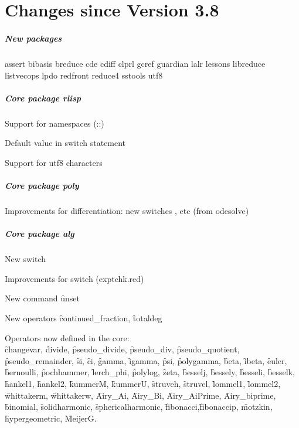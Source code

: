\chapter{Changes since Version 3.8}

\paragraph*{New packages}

assert
bibasis
breduce
cde
cdiff
clprl
gcref
guardian
lalr
lessons
libreduce
listvecops
lpdo
redfront
reduce4
sstools
utf8

\paragraph*{Core package rlisp}

Support for namespaces (::)

Default value in switch statement

Support for utf8 characters

\paragraph*{Core package poly}

Improvements for differentiation: new switches ,  etc
(from odesolve)

\paragraph*{Core package alg}

New switch 

Improvements for switch  (exptchk.red)

New command \f{unset}

New operators \f{continued\_fraction}, \f{totaldeg}

Operators now defined in the \REDUCE core:\\
\f{changevar},
\f{divide}, \f{pseudo\_divide}, \f{pseudo\_div}, \f{pseudo\_quotient}, \f{pseudo\_remainder},
\f{si}, \f{ci}, \f{gamma}, \f{igamma}, \f{psi}, \f{polygamma}, \f{beta}, \f{ibeta},
\f{euler},
\f{bernoulli}, \f{pochhammer}, \f{lerch\_phi}, \f{polylog}, \f{zeta}, 
\f{besselj},
\f{bessely},
\f{besseli},
\f{besselk},
\f{hankel1},
\f{hankel2},
\f{kummerM},
\f{kummerU},
\f{struveh},
\f{struvel},
\f{lommel1},
\f{lommel2},
\f{whittakerm},
\f{whittakerw},
\f{Airy\_Ai},
\f{Airy\_Bi},
\f{Airy\_AiPrime},
\f{Airy\_biprime},
\f{binomial},
\f{solidharmonic},
\f{sphericalharmonic},
\f{fibonacci},\f{fibonaccip},
\f{motzkin},
\f{hypergeometric}, \f{MeijerG}.

